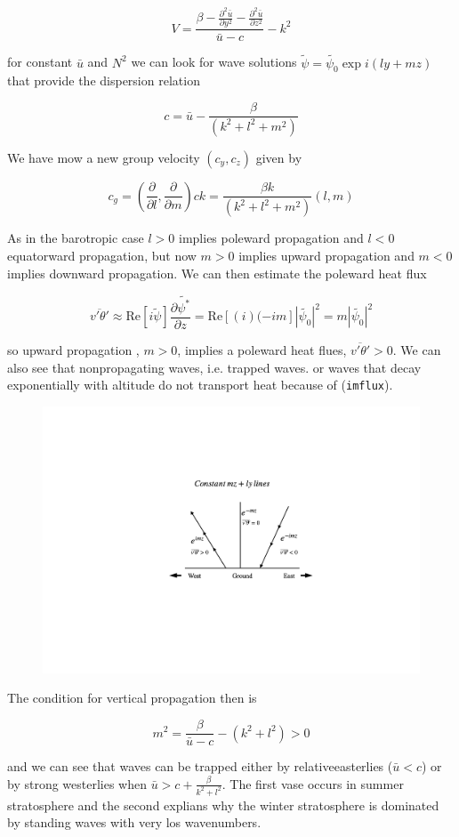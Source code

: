 \[V = \frac{\displaystyle \beta -\frac{\partial^{2} \bar{u}}{\partial y^{2}}-\frac{\partial^{2} \bar{u}}{\partial z^{2}}}{\bar{u}-c} - k^2\]

for constant \(\bar{u}\) and \(N^2\) we can look for wave solutions
\(\tilde{\psi} = \tilde{\psi_0}\exp{i(ly + mz)}\) that provide the
dispersion relation

\[c = \bar{u}-\frac{\beta}{(k^2+l^2+m^2)}\]

We have mow a new group velocity \((c_y, c_z)\) given by

\[c_g = \left(\frac{\partial }{\partial l},\frac{\partial }{\partial m}\right)c k = \frac{\beta k}{(k^2+l^2+m^2)} (l,m)\]

As in the barotropic case \(l>0\) implies poleward propagation and
\(l<0\) equatorward propagation, but now \(m>0\) implies upward
propagation and \(m<0\) implies downward propagation. We can then
estimate the poleward heat flux

{\[\overline{v'\theta'} \approx \mathrm{Re}\left[  i\tilde{\psi}\right]\frac{\partial \tilde{\psi^*}}{\partial z}=\mathrm{Re}\left[ (i)(-im\right]|\tilde{\psi_0}|^2 = m |\tilde{\psi_0}|^2\]}

so upward propagation , \(m > 0\), implies a poleward heat flues,
\(\overline{v'\theta'} > 0\). We can also see that nonpropagating waves,
i.e. trapped waves. or waves that decay exponentially with altitude do
not transport heat because of (\texttt{imflux}).

\begin{figure}
\centering
\includegraphics[width= .7 \textwidth]{figs/GD/VertSlant.png}
\caption{}
\label{fig:}
\end{figure}

The condition for vertical propagation then is

\[m^2 = \frac{\beta}{\bar{u}-c} -(k^2+l^2) > 0\]

and we can see that waves can be trapped either by relativeeasterlies
(\(\bar{u}< c\)) or by strong westerlies when
\(\bar{u}> c +\frac{\beta}{k^2+l^2}\). The first vase occurs in summer
stratosphere and the second explians why the winter stratosphere is
dominated by standing waves with very los wavenumbers.

